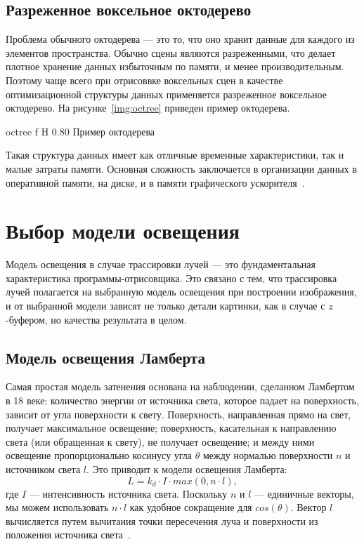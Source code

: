 \subsection{Разреженное воксельное октодерево}

Проблема обычного октодерева --- это то, что оно хранит данные для каждого из элементов 
пространства. Обычно сцены являются разреженными, что делает плотное хранение данных
избыточным по памяти, и менее производительным. Поэтому чаще всего при отрисоввке
воксельных сцен в качестве оптимизационной структуры данных применяется разреженное воксельное
октодерево. На рисунке~\ref{img:octree} приведен пример октодерева. 

    {octree}
    {f}
    {H}
    {0.80\textwidth}
    {Пример октодерева~\cite{Octree}}

Такая структура данных имеет как отличные временные характеристики, так и малые затраты памяти.
Основная сложность заключается в организации данных в оперативной памяти, на диске, 
и в памяти графического ускорителя~\cite{ESVOAEaI}.

\section{Выбор модели освещения}

Модель освещения в случае трассировки лучей --- это фундаментальная характеристика программы-отрисовщика. Это связано с тем, что трассировка лучей полагается на выбранную модель освещения
при построении изображения, и от выбранной модели зависят не только детали картинки, как в случае с $z$-буфером, но качества результата в целом.

\subsection{Модель освещения Ламберта}
Самая простая модель затенения основана на наблюдении, сделанном Ламбертом в 18 веке: 
количество энергии от источника света, которое падает на поверхность, зависит от угла 
поверхности к свету. Поверхность, направленная прямо на свет, получает максимальное 
освещение; поверхность, касательная к направлению света (или обращенная к свету), 
не получает освещение; и между ними освещение пропорционально косинусу угла $\theta$
между нормалью поверхности $n$ и источником света $l$. Это приводит к 
модели освещения Ламберта:
\begin{equation}
L = k_d \cdot I \cdot max(0, n \cdot l),
\end{equation}
где $I$ --- интенсивность источника света. Поскольку $n$ и $l$ --- единичные векторы, мы можем использовать $n \cdot l$ как удобное сокращение для $cos(\theta)$. 
Вектор $l$ вычисляется путем вычитания точки пересечения луча и поверхности из положения 
источника света~\cite{FoCG}.

